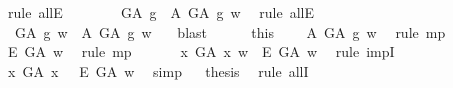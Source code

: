 \begin{isabellebody}
\ {\isacharparenleft}rule\ allE{\isacharparenright}\ %
\isanewline
\ \ \ \ \isamarkupfalse%
\ \ {\isachardoublequoteopen}{\isacharparenleft}G\isactrlsup A\ g\ \isactrlbold {\isasymrightarrow}\ {\isacharparenleft}{\isasymE}\isactrlsup A\ G\isactrlsup A\ g{\isacharparenright}{\isacharparenright}\ w{\isachardoublequoteclose}\ \isamarkupfalse%
\ {\isacharparenleft}rule\ allE{\isacharparenright}\isanewline
\ \ \ \ \isamarkupfalse%
\ \ {\isachardoublequoteopen}G\isactrlsup A\ g\ w\ {\isasymlongrightarrow}\ {\isasymE}\isactrlsup A\ G\isactrlsup A\ g\ w{\isachardoublequoteclose}\ \ \isamarkupfalse%
\ blast\isanewline
\ \ \ \ \isamarkupfalse%
\ this\ {}\ \isamarkupfalse%
\ {}{\isacharcolon}\ {\isachardoublequoteopen}{\isasymE}\isactrlsup A\ G\isactrlsup A\ g\ w{\isachardoublequoteclose}\ \isamarkupfalse%
\ {\isacharparenleft}rule\ mp{\isacharparenright}\isanewline
\ \ \ \ \isamarkupfalse%
\ {}\ {}\ \isamarkupfalse%
\ {\isachardoublequoteopen}{\isacharparenleft}\isactrlbold {\isasymbox}\isactrlbold {\isasymexists}\isactrlsup E\ G\isactrlsup A{\isacharparenright}\ w{\isachardoublequoteclose}\ \isamarkupfalse%
\ {\isacharparenleft}rule\ mp{\isacharparenright}\isanewline
\ \ \isacommand{{\isacharbraceright}}\isamarkupfalse%
\isanewline
\ \ \isamarkupfalse%
\ {\isachardoublequoteopen}{\isacharparenleft}{\isasymexists}x{\isachardot}\ G\isactrlsup A\ x\ w{\isacharparenright}\ {\isasymlongrightarrow}\ {\isacharparenleft}\isactrlbold {\isasymbox}\isactrlbold {\isasymexists}\isactrlsup E\ G\isactrlsup A{\isacharparenright}\ w{\isachardoublequoteclose}\ \isamarkupfalse%
\ {\isacharparenleft}rule\ impI{\isacharparenright}\isanewline
\ \ \isamarkupfalse%
\ {\isachardoublequoteopen}{\isacharparenleft}{\isacharparenleft}\isactrlbold {\isasymexists}x{\isachardot}\ G\isactrlsup A\ x{\isacharparenright}\ \isactrlbold {\isasymrightarrow}\ \ \isactrlbold {\isasymbox}\isactrlbold {\isasymexists}\isactrlsup E\ G\isactrlsup A{\isacharparenright}\ w{\isachardoublequoteclose}\ \isamarkupfalse%
\ simp\isanewline
\isacommand{{\isacharbraceright}}\isamarkupfalse%
\isanewline
\ \isamarkupfalse%
\ {\isacharquery}thesis\ \isamarkupfalse%
\ {\isacharparenleft}rule\ allI{\isacharparenright}\ \isanewline
{}\isamarkupfalse%

\end{isabellebody}
